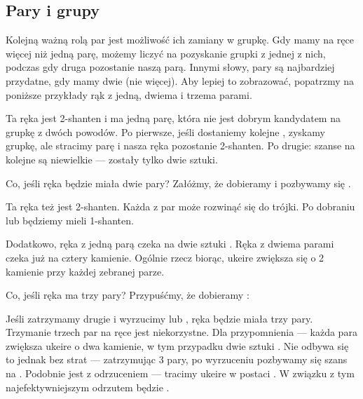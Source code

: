 \subsection{Pary i grupy} \label{sec:2pairs}
Kolejną ważną rolą par jest możliwość ich zamiany w grupkę.
Gdy mamy na ręce więcej niż jedną parę, możemy liczyć na pozyskanie grupki z jednej z nich, podczas gdy druga pozostanie naszą parą.
Innymi słowy, pary są najbardziej przydatne, gdy mamy dwie (nie więcej).
Aby lepiej to zobrazować, popatrzmy na poniższe przykłady rąk z jedną, dwiema i trzema parami.

\begin{screen}
\end{screen}
\noindent
Ta ręka jest 2-{\jap shanten} i ma jedną parę, która nie jest dobrym kandydatem na grupkę z dwóch powodów.
Po pierwsze, jeśli dostaniemy kolejne , zyskamy grupkę, ale stracimy parę i nasza ręka pozostanie 2-{\jap shanten}.
Po drugie: szanse na kolejne  są niewielkie --- zostały tylko dwie sztuki.

\bigskip
Co, jeśli ręka będzie miała dwie pary?
Załóżmy, że dobieramy  i pozbywamy się .

\bigskip
\begin{screen}
\end{screen}
\noindent Ta ręka też jest 2-{\jap shanten}.
Każda z par może rozwinąć się do trójki.
Po dobraniu  lub  będziemy mieli 1-{\jap shanten}.

\bigskip
Dodatkowo, ręka z jedną parą czeka na dwie sztuki .
Ręka z dwiema parami czeka już na cztery kamienie.
Ogólnie rzecz biorąc, {\jap ukeire} zwiększa się o 2 kamienie przy każdej zebranej parze.

\bigskip
Co, jeśli ręka ma trzy pary? Przypuśćmy, że dobieramy :

\bigskip
\begin{screen}
\end{screen}
\noindent Jeśli zatrzymamy drugie  i wyrzucimy  lub , ręka będzie miała trzy pary.
Trzymanie trzech par na ręce jest niekorzystne.
Dla przypomnienia --- każda para zwiększa {\jap ukeire} o dwa kamienie, w tym przypadku dwie sztuki .
Nie odbywa się to jednak bez strat --- zatrzymując 3 pary, po wyrzuceniu  pozbywamy się szans na .
Podobnie jest z odrzuceniem  --- tracimy {\jap ukeire} w postaci .
W związku z tym najefektywniejszym odrzutem będzie .

